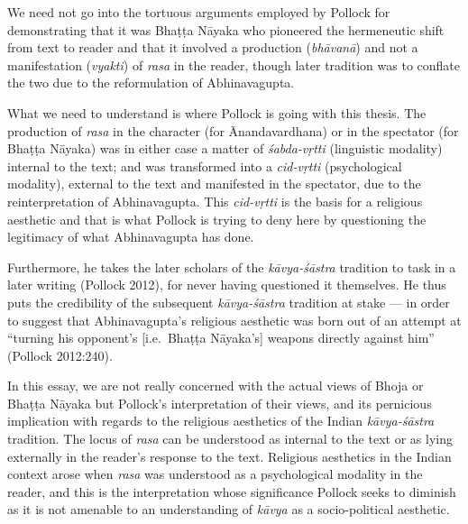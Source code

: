 We need not go into the tortuous arguments employed by Pollock for demonstrating that it was Bhaṭṭa Nāyaka who pioneered the hermeneutic shift from text to reader and that it involved a production (\textsl{bhāvanā}) and not a manifestation (\textsl{vyakti}) of \textsl{rasa} in the reader, though later tradition was to conflate the two due to the reformulation of Abhinavagupta. 
 
What we need to understand is where Pollock is going with this thesis. The production of \textsl{rasa} in the character (for Ānandavardhana) or in the spectator (for Bhaṭṭa Nāyaka) was in either case a matter of \textsl{śabda-vṛtti} (linguistic modality) internal to the text; and was transformed into a \textsl{cid-vṛtti} (psychological modality), external to the text and manifested in the spectator, due to the reinterpretation of Abhinavagupta. This \textsl{cid-vṛtti} is the basis for a religious aesthetic and that is what Pollock is trying to deny here by questioning the legitimacy of what Abhinavagupta has done. 
 
Furthermore, he takes the later scholars of the \textsl{kāvya-śāstra} tradition to task in a later writing (Pollock 2012), for never having questioned it themselves. He thus puts the credibility of the subsequent \textsl{kāvya-śāstra} tradition at stake --- in order to suggest that Abhinavagupta's religious aesthetic was born out of an attempt at ``turning his opponent's [i.e.\ Bhaṭṭa Nāyaka's] weapons directly against him'' (Pollock 2012:240).

In this essay, we are not really concerned with the actual views of Bhoja or Bhaṭṭa Nāyaka but Pollock's interpretation of their  views, and its pernicious implication with regards to the religious aesthetics of the Indian \textsl{kāvya-śāstra} tradition. The locus of \textsl{rasa} can be understood as internal to the text or as lying externally in the reader's response to the text. Religious aesthetics in the Indian context arose when \textsl{rasa} was understood as a psychological modality in the reader, and this is the interpretation whose significance Pollock seeks to diminish as it is not amenable to an understanding of \textsl{kāvya} as a socio-political aesthetic. 

